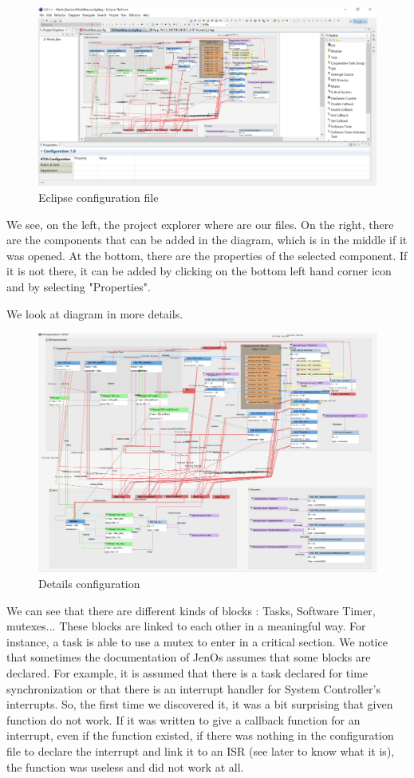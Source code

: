 \begin{figure}[ht]
\centering
\includegraphics[width=.6\linewidth]{eclipse}
\caption[Eclipse Configuration file]{\label{f:eclipse}Eclipse configuration file}
\end{figure}

We see, on the left, the project explorer where are our files. On the right, there are the components that can be added in the diagram, which is in the middle if it was opened. At the bottom, there are the properties of the selected component. If it is not there, it can be added by clicking on the bottom left hand corner icon and by selecting "Properties".

We look at diagram in more details.

\begin{figure}[ht]
\centering
\includegraphics[width=.6\linewidth]{global_config}
\caption[Details Configuration]{\label{f:global_config}Details configuration}
\end{figure}

We can see that there are different kinds of blocks : Tasks, Software Timer, mutexes... These blocks are linked to each other in a meaningful way. For instance, a task is able to use a mutex to enter in a critical section. We notice that sometimes the documentation of JenOs assumes that some blocks are declared. For example, it is assumed that there is a task declared for time synchronization or that there is an interrupt handler for System Controller's interrupts. So, the first time we discovered it, it was a bit surprising that given function do not work. If it was written to give a callback function for an interrupt, even if the function existed, if there was nothing in the configuration file to declare the interrupt and link it to an ISR (see later to know what it is), the function was useless and did not work at all.

